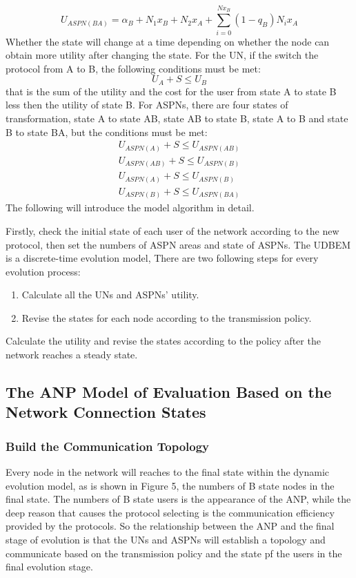 \documentclass{article}
\begin{document}
\begin{displaymath}
U_{ASPN(BA)}=\alpha_{B}+N_{1}x_{B}+N_{2}x_{A}+\sum_{i=0}^{Nx_{B}}(1-q_{B})N_{i}x_{A}
\end{displaymath}
Whether the state will change at a time depending on whether the node can obtain more utility after changing the state. 
For the UN, if the switch the protocol from A to B, the following conditions must be met:
\begin{displaymath}
U_{A}+S\leq U_{B}
\end{displaymath}
that is the sum of the utility and the cost for the user from state A to state B less then the utility of state B.
For ASPNs, there are four states of transformation, state A to state AB, state AB to state B, state A to B and state B
to state BA, but the conditions must be met:
\begin{equation}
\begin{aligned}
U_{ASPN(A)}+S \leq U_{ASPN(AB)}\\
U_{ASPN(AB)}+S \leq U_{ASPN(B)}\\
U_{ASPN(A)}+S \leq U_{ASPN(B)}\\
U_{ASPN(B)}+S \leq U_{ASPN(BA)}
\end{aligned}
\end{equation}
The following will introduce the model algorithm in detail.

Firstly, check the initial state of each user of the network according to the new protocol, then set the numbers of ASPN 
areas and state of ASPNs. The UDBEM is a discrete-time evolution model, There are two following steps for
every evolution process:
\begin{enumerate}
    \item Calculate all the UNs and ASPNs' utility.
    \item Revise the states for each node according to the transmission policy.
\end{enumerate}
   Calculate the utility and revise the states according to the policy after the network reaches a steady state.

\subsection{The ANP Model of Evaluation Based on the Network Connection States}

\subsubsection{Build the Communication Topology}
Every node in the network will reaches to the final state within the dynamic evolution model, as is shown in Figure 5,
the numbers of B state nodes in the final state. The numbers of B state users is the appearance of the ANP, while the deep reason
that causes the protocol selecting is the communication efficiency provided by the protocols. So the relationship between
the ANP and the final stage of evolution is that the UNs and ASPNs will establish a topology and communicate based on
the transmission policy and the state pf the users in the final evolution stage.
\end{document}
